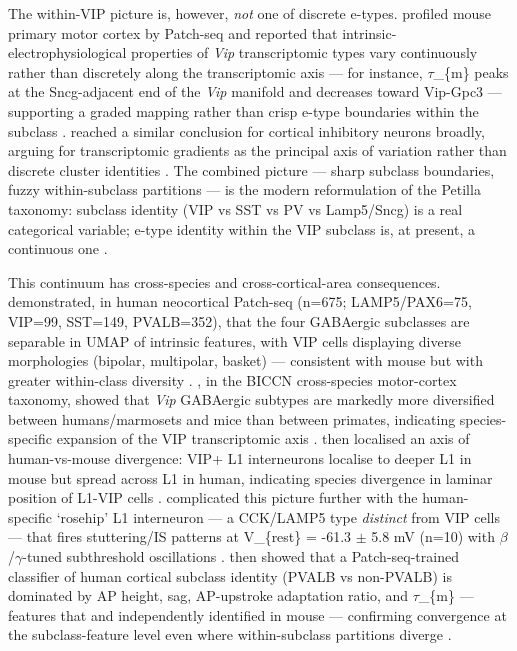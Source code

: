 \documentclass[11pt]{article}
\begin{document}
The within-VIP picture is, however, \textit{not} one of discrete e-types. \citet{Scala2021} profiled mouse primary motor cortex by Patch-seq and reported that intrinsic-electrophysiological properties of \textit{Vip} transcriptomic types vary continuously rather than discretely along the transcriptomic axis --- for instance, $\tau$\_\{m\} peaks at the Sncg-adjacent end of the \textit{Vip} manifold and decreases toward Vip-Gpc3 --- supporting a graded mapping rather than crisp e-type boundaries within the subclass \citep{Scala2021}. \citet{Bugeon2022} reached a similar conclusion for cortical inhibitory neurons broadly, arguing for transcriptomic gradients as the principal axis of variation rather than discrete cluster identities \citep{Bugeon2022}. The combined picture --- sharp subclass boundaries, fuzzy within-subclass partitions --- is the modern reformulation of the Petilla taxonomy: subclass identity (VIP vs SST vs PV vs Lamp5/Sncg) is a real categorical variable; e-type identity within the VIP subclass is, at present, a continuous one \citep{Gouwens2020a, Scala2021, Bugeon2022, Yao2021a}.

This continuum has cross-species and cross-cortical-area consequences. \citet{Lee2023a} demonstrated, in human neocortical Patch-seq (n=675; LAMP5/PAX6=75, VIP=99, SST=149, PVALB=352), that the four GABAergic subclasses are separable in UMAP of intrinsic features, with VIP cells displaying diverse morphologies (bipolar, multipolar, basket) --- consistent with mouse but with greater within-class diversity \citep{Lee2023a}. \citet{Bakken2021a}, in the BICCN cross-species motor-cortex taxonomy, showed that \textit{Vip} GABAergic subtypes are markedly more diversified between humans/marmosets and mice than between primates, indicating species-specific expansion of the VIP transcriptomic axis \citep{Bakken2021a, Braininitiativecellcensusnetworkbiccn2021}. \citet{Chartrand2023} then localised an axis of human-vs-mouse divergence: VIP+ L1 interneurons localise to deeper L1 in mouse but spread across L1 in human, indicating species divergence in laminar position of L1-VIP cells \citep{Chartrand2023}. \citet{Boldog2018} complicated this picture further with the human-specific `rosehip' L1 interneuron --- a CCK/LAMP5 type \textit{distinct} from VIP cells --- that fires stuttering/IS patterns at V\_\{rest\} = -61.3 $\pm$ 5.8 mV (n=10) with $\beta$/$\gamma$-tuned subthreshold oscillations \citep{Boldog2018}. \citet{Kim2023} then showed that a Patch-seq-trained classifier of human cortical subclass identity (PVALB vs non-PVALB) is dominated by AP height, sag, AP-upstroke adaptation ratio, and $\tau$\_\{m\} --- features that \citet{Gouwens2020a} and \citet{Gouwens2019} independently identified in mouse --- confirming convergence at the subclass-feature level even where within-subclass partitions diverge \citep{Kim2023, Gouwens2020a}.
\end{document}
